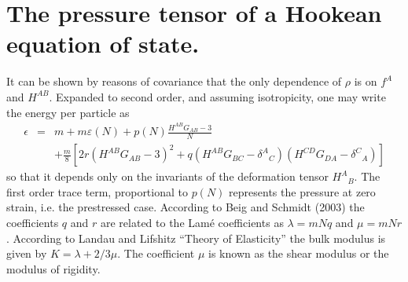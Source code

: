 \section{The pressure tensor of a Hookean equation of state.}

It can be shown by reasons of covariance that the only dependence of $\rho$ is on $f^A$ and $H^{AB}$. Expanded to second order, and assuming isotropicity, one may write the energy per particle as
\begin{equation}
\label{eqn:eos}
\begin{array}{rcl}
\epsilon & = & \displaystyle{m + m\varepsilon(N) + p(N)\frac{H^{AB}G_{AB}-3}{N}} \\
 && + \frac{m}{8}\left[ 2r\left(H^{AB}G_{AB}-3\right)^2 + q\left(H^{AB}G_{BC} - \delta^{A}{}_C\right)\left(H^{CD}G_{DA} - \delta^{C}{}_A\right) \right]
 \end{array}
\end{equation}
so that it depends only on the invariants of the deformation tensor $H^{A}{}_{B}$. The first order trace term, proportional to $p(N)$ represents the pressure at zero strain, i.e. the prestressed case. According to Beig and Schmidt (2003) the coefficients $q$ and $r$ are related to the Lam\'e coefficients as $\lambda = mNq$ and $\mu = mNr$. According to Landau and Lifshitz ``Theory of Elasticity'' the bulk modulus is given by $K=\lambda + 2/3 \mu$. The coefficient $\mu$ is known as the shear modulus or the modulus of rigidity.

